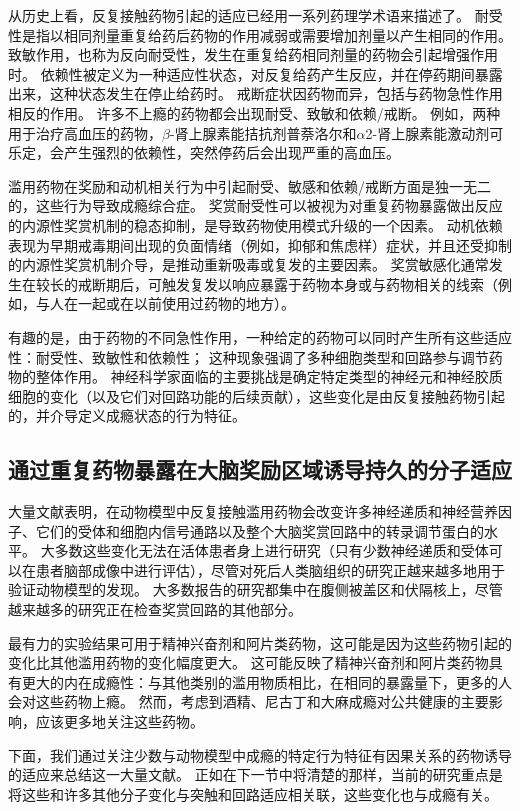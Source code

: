 从历史上看，反复接触药物引起的适应已经用一系列药理学术语来描述了。
耐受性是指以相同剂量重复给药后药物的作用减弱或需要增加剂量以产生相同的作用。
致敏作用，也称为反向耐受性，发生在重复给药相同剂量的药物会引起增强作用时。
依赖性被定义为一种适应性状态，对反复给药产生反应，并在停药期间暴露出来，这种状态发生在停止给药时。
戒断症状因药物而异，包括与药物急性作用相反的作用。
许多不上瘾的药物都会出现耐受、致敏和依赖/戒断。
例如，两种用于治疗高血压的药物，$ \beta $-肾上腺素能拮抗剂普萘洛尔和$ \alpha $2-肾上腺素能激动剂可乐定，会产生强烈的依赖性，突然停药后会出现严重的高血压。


滥用药物在奖励和动机相关行为中引起耐受、敏感和依赖/戒断方面是独一无二的，这些行为导致成瘾综合症。
奖赏耐受性可以被视为对重复药物暴露做出反应的内源性奖赏机制的稳态抑制，是导致药物使用模式升级的一个因素。
动机依赖表现为早期戒毒期间出现的负面情绪（例如，抑郁和焦虑样）症状，并且还受抑制的内源性奖赏机制介导，是推动重新吸毒或复发的主要因素。
奖赏敏感化通常发生在较长的戒断期后，可触发复发以响应暴露于药物本身或与药物相关的线索（例如，与人在一起或在以前使用过药物的地方）。


有趣的是，由于药物的不同急性作用，一种给定的药物可以同时产生所有这些适应性：耐受性、致敏性和依赖性； 
这种现象强调了多种细胞类型和回路参与调节药物的整体作用。
神经科学家面临的主要挑战是确定特定类型的神经元和神经胶质细胞的变化（以及它们对回路功能的后续贡献），这些变化是由反复接触药物引起的，并介导定义成瘾状态的行为特征。



\subsection{通过重复药物暴露在大脑奖励区域诱导持久的分子适应}

大量文献表明，在动物模型中反复接触滥用药物会改变许多神经递质和神经营养因子、它们的受体和细胞内信号通路以及整个大脑奖赏回路中的转录调节蛋白的水平。
大多数这些变化无法在活体患者身上进行研究（只有少数神经递质和受体可以在患者脑部成像中进行评估），尽管对死后人类脑组织的研究正越来越多地用于验证动物模型的发现。
大多数报告的研究都集中在腹侧被盖区和伏隔核上，尽管越来越多的研究正在检查奖赏回路的其他部分。


最有力的实验结果可用于精神兴奋剂和阿片类药物，这可能是因为这些药物引起的变化比其他滥用药物的变化幅度更大。
这可能反映了精神兴奋剂和阿片类药物具有更大的内在成瘾性：与其他类别的滥用物质相比，在相同的暴露量下，更多的人会对这些药物上瘾。
然而，考虑到酒精、尼古丁和大麻成瘾对公共健康的主要影响，应该更多地关注这些药物。


下面，我们通过关注少数与动物模型中成瘾的特定行为特征有因果关系的药物诱导的适应来总结这一大量文献。
正如在下一节中将清楚的那样，当前的研究重点是将这些和许多其他分子变化与突触和回路适应相关联，这些变化也与成瘾有关。


